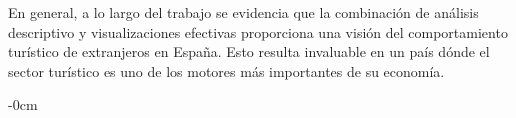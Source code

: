 \documentclass[data,article,submit,moreauthors,pdftex]{Definitions/mdpi}
\begin{document}
En general, a lo largo del trabajo se evidencia que la combinación de
análisis descriptivo y visualizaciones efectivas proporciona una visión
del comportamiento turístico de extranjeros en España. Esto resulta
invaluable en un país dónde el sector turístico es uno de los motores
más importantes de su economía.


\vspace{6pt}














\begin{adjustwidth}{-\extralength}{0cm}





%

\PublishersNote{}
\end{adjustwidth}
\end{document}

